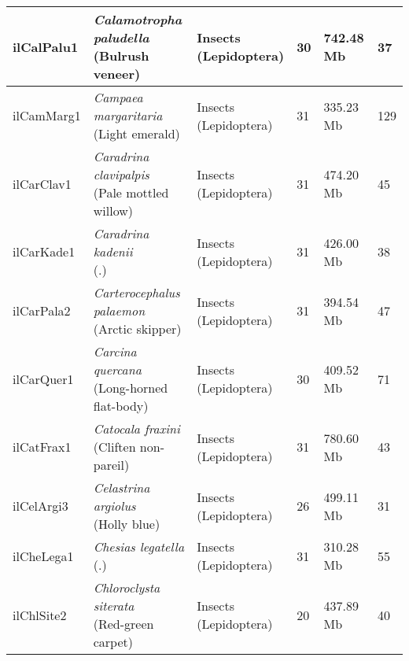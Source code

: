 \begin{centering}
\begin{longtable}{l|l|l|l|l|l}
ilCalPalu1 & \makecell[{l}]{\textit{Calamotropha paludella} \\ (Bulrush veneer)} & \makecell[{l}]{Insects \\ (Lepidoptera)} & 30 & 742.48 Mb & 37  \\ \hline
ilCamMarg1 & \makecell[{l}]{\textit{Campaea margaritaria} \\ (Light emerald)} & \makecell[{l}]{Insects \\ (Lepidoptera)} & 31 & 335.23 Mb & 129  \\ \hline
ilCarClav1 & \makecell[{l}]{\textit{Caradrina clavipalpis} \\ (Pale mottled willow)} & \makecell[{l}]{Insects \\ (Lepidoptera)} & 31 & 474.20 Mb & 45  \\ \hline
ilCarKade1 & \makecell[{l}]{\textit{Caradrina kadenii} \\ (.)} & \makecell[{l}]{Insects \\ (Lepidoptera)} & 31 & 426.00 Mb & 38  \\ \hline
ilCarPala2 & \makecell[{l}]{\textit{Carterocephalus palaemon} \\ (Arctic skipper)} & \makecell[{l}]{Insects \\ (Lepidoptera)} & 31 & 394.54 Mb & 47  \\ \hline
ilCarQuer1 & \makecell[{l}]{\textit{Carcina quercana} \\ (Long-horned flat-body)} & \makecell[{l}]{Insects \\ (Lepidoptera)} & 30 & 409.52 Mb & 71  \\ \hline
ilCatFrax1 & \makecell[{l}]{\textit{Catocala fraxini} \\ (Cliften non-pareil)} & \makecell[{l}]{Insects \\ (Lepidoptera)} & 31 & 780.60 Mb & 43  \\ \hline
ilCelArgi3 & \makecell[{l}]{\textit{Celastrina argiolus} \\ (Holly blue)} & \makecell[{l}]{Insects \\ (Lepidoptera)} & 26 & 499.11 Mb & 31  \\ \hline
ilCheLega1 & \makecell[{l}]{\textit{Chesias legatella} \\ (.)} & \makecell[{l}]{Insects \\ (Lepidoptera)} & 31 & 310.28 Mb & 55  \\ \hline
ilChlSite2 & \makecell[{l}]{\textit{Chloroclysta siterata} \\ (Red-green carpet)} & \makecell[{l}]{Insects \\ (Lepidoptera)} & 20 & 437.89 Mb & 40  \\ \hline

\end{longtable}
\end{centering}

